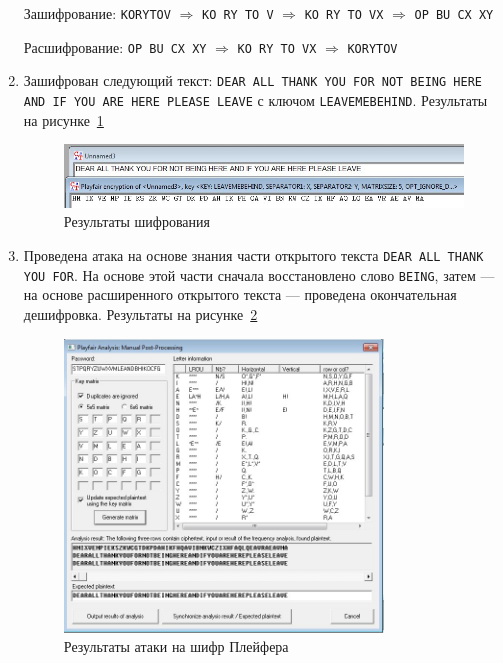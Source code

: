 \documentclass[a4paper, 14pt]{extarticle}
\begin{document}
\begin{enumerate}
    Зашифрование: \texttt{KORYTOV} $\Rightarrow$ \texttt{KO RY TO V} $\Rightarrow$ \texttt{KO RY TO VX} $\Rightarrow$ \texttt{OP BU CX XY}

    Расшифрование: \texttt{OP BU CX XY} $\Rightarrow$ \texttt{KO RY TO VX} $\Rightarrow$ \texttt{KORYTOV}
    
    \FloatBarrier{}
    \item Зашифрован следующий текст: \texttt{DEAR ALL THANK YOU FOR NOT BEING HERE AND IF YOU ARE HERE PLEASE LEAVE} с ключом \texttt{LEAVEMEBEHIND}. Результаты на рисунке~\ref{img:3:2}

    \begin{figure}[h]
        \centering
        \includegraphics[width=\textwidth]{./img/S009.jpg}
        \caption{Результаты шифрования}%
        \label{img:3:2}
    \end{figure}
    
    \item Проведена атака на основе знания части открытого текста \texttt{DEAR ALL THANK YOU FOR}. На основе этой части сначала восстановлено слово \texttt{BEING}, затем --- на основе расширенного открытого текста --- проведена окончательная дешифровка. Результаты на рисунке~\ref{img:3:3}
    \begin{figure}[h]
        \centering
        \includegraphics[width=0.8\textwidth]{./img/S010.jpg}
        \caption{Результаты атаки на шифр Плейфера}%
        \label{img:3:3}
    \end{figure}
    

\end{enumerate}
\end{document}
